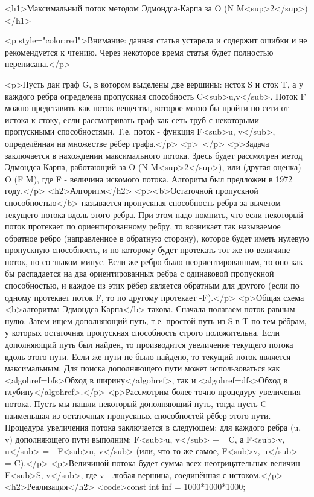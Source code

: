 <h1>Максимальный поток методом Эдмондса-Карпа за O (N M<sup>2</sup>)</h1>

<p style="color:red">Внимание: данная статья устарела и содержит ошибки и не рекомендуется к чтению. Через некоторое время статья будет полностью переписана.</p>

<p>Пусть дан граф G, в котором выделены две вершины: исток S и сток T, а у каждого ребра определена пропускная способность C<sub>u,v</sub>. Поток F можно представить как поток вещества, которое могло бы пройти по сети от истока к стоку, если рассматривать граф как сеть труб с некоторыми пропускными способностями. Т.е. поток - функция F<sub>u, v</sub>, определённая на множестве рёбер графа.</p>
<p> </p>
<p>Задача заключается в нахождении максимального потока. Здесь будет рассмотрен метод Эдмондса-Карпа, работающий за O (N M<sup>2</sup>), или (другая оценка) O (F M), где F - величина искомого потока. Алгоритм был предложен в 1972 году.</p>
<h2>Алгоритм</h2>
<p><b>Остаточной пропускной способностью</b> называется пропускная способность ребра за вычетом текущего потока вдоль этого ребра. При этом надо помнить, что если некоторый поток протекает по ориентированному ребру, то возникает так называемое обратное ребро (направленное в обратную сторону), которое будет иметь нулевую пропускную способность, и по которому будет протекать тот же по величине поток, но со знаком минус. Если же ребро было неориентированным, то оно как бы распадается на два ориентированных ребра с одинаковой пропускной способностью, и каждое из этих рёбер является обратным для другого (если по одному протекает поток F, то по другому протекает -F).</p>
<p>Общая схема <b>алгоритма Эдмондса-Карпа</b> такова. Сначала полагаем поток равным нулю. Затем ищем дополняющий путь, т.е. простой путь из S в T по тем рёбрам, у которых остаточная пропускная способность строго положительна. Если дополняющий путь был найден, то производится увеличение текущего потока вдоль этого пути. Если же пути не было найдено, то текущий поток является максимальным. Для поиска дополняющего пути может использоваться как <algohref=bfs>Обход в ширину</algohref>, так и <algohref=dfs>Обход в глубину</algohref>.</p>
<p>Рассмотрим более точно процедуру увеличения потока. Пусть мы нашли некоторый дополняющий путь, тогда пусть C - наименьшая из остаточных пропускных способностей рёбер этого пути. Процедура увеличения потока заключается в следующем: для каждого ребра (u, v) дополняющего пути выполним: F<sub>u, v</sub> += C, а F<sub>v, u</sub> = - F<sub>u, v</sub> (или, что то же самое, F<sub>v, u</sub> -= C).</p>
<p>Величиной потока будет сумма всех неотрицательных величин F<sub>S, v</sub>, где v - любая вершина, соединённая с истоком.</p>
<h2>Реализация</h2>
<code>const int inf = 1000*1000*1000;


